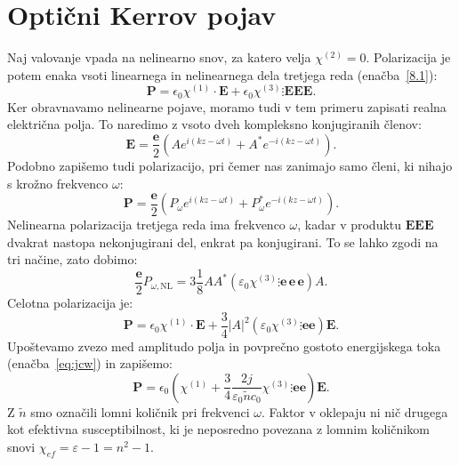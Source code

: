 \section{Optični Kerrov pojav}
\label{OKP}
Naj valovanje vpada na nelinearno snov, za katero velja $\chi^{(2)} = 0$.
Polarizacija je potem enaka vsoti linearnega in nelinearnega dela tretjega reda 
(enačba~\ref{8.1}):
\begin{equation}
\mathbf{P}=
\epsilon_{0} \chi^{(1)}\cdot \mathbf{E}+
\epsilon_{0}\chi^{(3)}\vdots \mathbin \mathbf{E}\mathbin \mathbf{E}\mathbin\mathbf{E}.
\end{equation}
Ker obravnavamo nelinearne pojave, moramo tudi v tem primeru zapisati realna
električna polja. To naredimo z vsoto dveh kompleksno konjugiranih členov:
\begin{equation}
\mathbf{E}=\frac{\mathbf{e}}{2}\left(Ae^{i(kz-\omega t)}+A^{*}e^{-i(kz-\omega t)}\right)\!\!.
\label{8.71}
\end{equation}
Podobno zapišemo tudi polarizacijo, pri čemer nas zanimajo samo členi,
ki nihajo s krožno frekvenco $\omega$:
\begin{equation}
\mathbf{P}=\frac{\mathbf{e}}{2}\left(P_\omega e^{i(kz-\omega t)}+P_\omega^{*}e^{-i(kz-\omega t)}\right)\!\!.
\label{8.71a}
\end{equation}
Nelinearna polarizacija tretjega reda ima frekvenco $\omega$, kadar v produktu 
$\mathbf{E}\mathbin \mathbf{E}\mathbin\mathbf{E}$ 
dvakrat nastopa nekonjugirani del, enkrat pa konjugirani. To se lahko zgodi na tri
načine, zato dobimo:
\begin{equation}
\frac{\mathbf{e}}{2}P_{\omega,\mathrm{NL}} = 3 \frac{1}{8} A A^* \left( 
\varepsilon_0 \chi^{(3)}\vdots \mathbf{e}\, \mathbf{e} \, \mathbf{e} \right) A.
\label{pomega}
\end{equation}
Celotna polarizacija je:
\begin{equation}
\mathbf{P}=
\epsilon_{0} \chi^{(1)}\cdot \mathbf{E}+\frac{3}{4} |A|^2 \left( 
\varepsilon_0 \chi^{(3)}\vdots \mathbin \mathbf{e}\mathbin \mathbf{e} \right) \mathbf{E}.
\label{eq:ptnl}
\end{equation}
Upoštevamo zvezo med amplitudo polja in povprečno gostoto energijskega toka (enačba~\ref{eq:jcw}) in
zapišemo:
\begin{equation}
\mathbf{P}=
\epsilon_{0} \left( \chi^{(1)} +\frac{3}{4} \frac{2  j }
{\varepsilon_0 \tilde{n} c_0} \chi^{(3)}\vdots \mathbin \mathbf{e}\mathbin 
\mathbf{e} \right) \mathbf{E}.
\label{eq:pppeee}
\end{equation}
Z $\tilde{n}$ smo označili lomni količnik pri frekvenci $\omega$. 
Faktor v oklepaju ni nič drugega kot efektivna susceptibilnost, ki je neposredno povezana
z lomnim količnikom snovi $\chi_{ef} = \varepsilon -1 =n^2 -1$.

